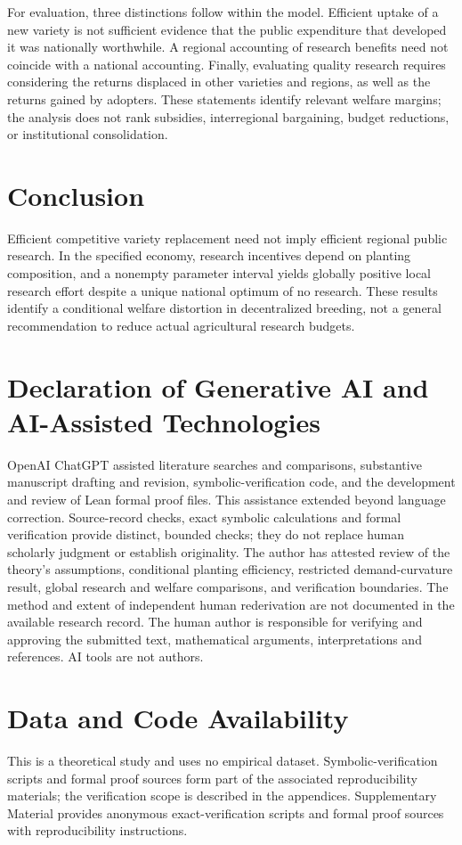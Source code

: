 \documentclass[USenglish]{article}
\begin{document}
For evaluation, three distinctions follow within the model. Efficient uptake of a new variety is not sufficient evidence that the public expenditure that developed it was nationally worthwhile. A regional accounting of research benefits need not coincide with a national accounting. Finally, evaluating quality research requires considering the returns displaced in other varieties and regions, as well as the returns gained by adopters. These statements identify relevant welfare margins; the analysis does not rank subsidies, interregional bargaining, budget reductions, or institutional consolidation.

\section{Conclusion}
Efficient competitive variety replacement need not imply efficient regional public research. In the specified economy, research incentives depend on planting composition, and a nonempty parameter interval yields globally positive local research effort despite a unique national optimum of no research. These results identify a conditional welfare distortion in decentralized breeding, not a general recommendation to reduce actual agricultural research budgets.

\section*{Declaration of Generative AI and AI-Assisted Technologies}
OpenAI ChatGPT assisted literature searches and comparisons, substantive manuscript drafting and revision, symbolic-verification code, and the development and review of Lean formal proof files. This assistance extended beyond language correction. Source-record checks, exact symbolic calculations and formal verification provide distinct, bounded checks; they do not replace human scholarly judgment or establish originality. The author has attested review of the theory's assumptions, conditional planting efficiency, restricted demand-curvature result, global research and welfare comparisons, and verification boundaries. The method and extent of independent human rederivation are not documented in the available research record. The human author is responsible for verifying and approving the submitted text, mathematical arguments, interpretations and references. AI tools are not authors.

\section*{Data and Code Availability}
This is a theoretical study and uses no empirical dataset. Symbolic-verification scripts and formal proof sources form part of the associated reproducibility materials; the verification scope is described in the appendices. Supplementary Material provides anonymous exact-verification scripts and formal proof sources with reproducibility instructions.
\end{document}
